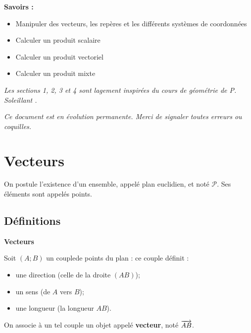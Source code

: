 \documentclass[10pt,oneside]{article}
\begin{document}
\begin{savoir}
\textbf{Savoirs :}
\begin{itemize}
\item Manipuler des vecteurs, les repères et les différents systèmes de coordonnées
\item Calculer un produit scalaire
\item Calculer un produit vectoriel
\item Calculer un produit mixte
\end{itemize}
\end{savoir}

\setlength{\parskip}{0ex plus 0.2ex minus 0ex}
 \renewcommand{\contentsname}{}
 \renewcommand{\baselinestretch}{1}

\textit{Les sections 1, 2, 3 et 4 sont lagement inspirées du cours de géométrie de P. Soleillant \cite{PS,DP}.}

\textit{Ce document est en évolution permanente. Merci de signaler toutes
erreurs ou coquilles.}

\tableofcontents

 \renewcommand{\baselinestretch}{1.2}
\setlength{\parskip}{2ex plus 0.5ex minus 0.2ex}



\section{Vecteurs}
On postule l'existence d'un ensemble, appelé plan euclidien, et noté $\mathcal{P}$. Ses éléments sont appelés points.
\subsection{Définitions}
\begin{defi}
\textbf{Vecteurs}

Soit $(A;B)$ un couple\footnotemark[1] de points du plan : ce couple définit :
\begin{itemize}
\item une direction (celle de la droite $(AB)$);
\item un sens (de $A$ vers $B$);
\item une longueur (la longueur $AB$).
\end{itemize}

On associe à un tel couple un objet appelé \textbf{vecteur}, noté $\overrightarrow{AB}$.
\end{defi}

\end{document}
